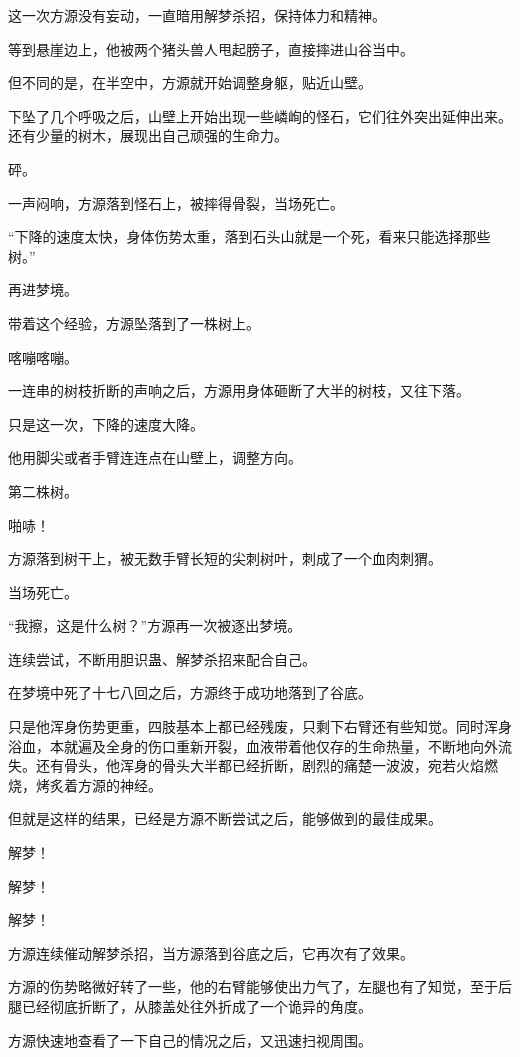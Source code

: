 \begin{this_body}
这一次方源没有妄动，一直暗用解梦杀招，保持体力和精神。

等到悬崖边上，他被两个猪头兽人甩起膀子，直接摔进山谷当中。

但不同的是，在半空中，方源就开始调整身躯，贴近山壁。

下坠了几个呼吸之后，山壁上开始出现一些嶙峋的怪石，它们往外突出延伸出来。还有少量的树木，展现出自己顽强的生命力。

砰。

一声闷响，方源落到怪石上，被摔得骨裂，当场死亡。

“下降的速度太快，身体伤势太重，落到石头山就是一个死，看来只能选择那些树。”

再进梦境。

带着这个经验，方源坠落到了一株树上。

喀嘣喀嘣。

一连串的树枝折断的声响之后，方源用身体砸断了大半的树枝，又往下落。

只是这一次，下降的速度大降。

他用脚尖或者手臂连连点在山壁上，调整方向。

第二株树。

啪哧！

方源落到树干上，被无数手臂长短的尖刺树叶，刺成了一个血肉刺猬。

当场死亡。

“我擦，这是什么树？”方源再一次被逐出梦境。

连续尝试，不断用胆识蛊、解梦杀招来配合自己。

在梦境中死了十七八回之后，方源终于成功地落到了谷底。

只是他浑身伤势更重，四肢基本上都已经残废，只剩下右臂还有些知觉。同时浑身浴血，本就遍及全身的伤口重新开裂，血液带着他仅存的生命热量，不断地向外流失。还有骨头，他浑身的骨头大半都已经折断，剧烈的痛楚一波波，宛若火焰燃烧，烤炙着方源的神经。

但就是这样的结果，已经是方源不断尝试之后，能够做到的最佳成果。

解梦！

解梦！

解梦！

方源连续催动解梦杀招，当方源落到谷底之后，它再次有了效果。

方源的伤势略微好转了一些，他的右臂能够使出力气了，左腿也有了知觉，至于后腿已经彻底折断了，从膝盖处往外折成了一个诡异的角度。

方源快速地查看了一下自己的情况之后，又迅速扫视周围。


\end{this_body}
